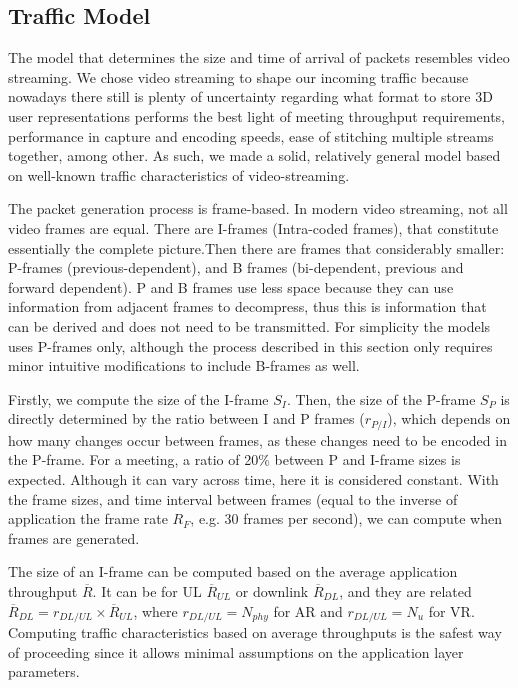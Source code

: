 \subsection{Traffic Model}
\label{sec:at}


The model that determines the size and time of arrival of packets resembles video streaming. We chose video streaming to shape our incoming traffic because nowadays there still is plenty of uncertainty regarding what format to store 3D user representations performs the best light of meeting throughput requirements, performance in capture and encoding speeds, ease of stitching multiple streams together, among other. As such, we made a solid, relatively general model based on well-known traffic characteristics of video-streaming.

The packet generation process is frame-based. In modern video streaming, not all video frames are equal. There are I-frames (Intra-coded frames), that constitute essentially the complete picture.Then there are frames that considerably smaller: P-frames (previous-dependent), and B frames (bi-dependent, previous and forward dependent). P and B frames use less space because they can use information from adjacent frames to decompress, thus this is information that can be derived and does not need to be transmitted. For simplicity the models uses P-frames only, although the process described in this section only requires minor intuitive modifications to include B-frames as well.


Firstly, we compute the size of the I-frame $S_I$. Then, the size of the P-frame $S_P$ is directly determined by the ratio between I and P frames ($r_{P/I}$), which depends on how many changes occur between frames, as these changes need to be encoded in the P-frame. For a meeting, a ratio of 20\% between P and I-frame sizes is expected. Although it can vary across time, here it is considered constant. With the frame sizes, and time interval between frames (equal to the inverse of application the frame rate $R_F$, e.g. 30 frames per second), we can compute when frames are generated. 

The size of an I-frame can be computed based on the average application throughput $\overline{R}$. It can be for UL $\overline{R}_{UL}$ or downlink $\overline{R}_{DL}$, and they are related $\overline{R}_{DL} = r_{DL/UL} \times \overline{R}_{UL}$, where $r_{DL/UL} = N_{phy}$ for AR and $r_{DL/UL} = N_{u}$ for VR. Computing traffic characteristics based on average throughputs is the safest way of proceeding since it allows minimal assumptions on the application layer parameters. 

